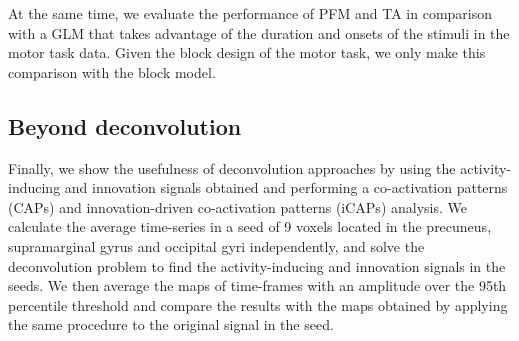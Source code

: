 At the same time, we evaluate the performance of PFM and TA in comparison with a GLM that takes advantage of the duration and onsets of the stimuli in the motor task data. Given the block design of the motor task, we only make this comparison with the block model.

\subsection{Beyond deconvolution}
Finally, we show the usefulness of deconvolution approaches by using the activity-inducing and innovation signals obtained and performing a co-activation patterns (CAPs) and innovation-driven co-activation patterns (iCAPs) analysis. We calculate the average time-series in a seed of 9 voxels located in the precuneus, supramarginal gyrus and occipital gyri independently, and solve the deconvolution problem to find the activity-inducing and innovation signals in the seeds. We then average the maps of time-frames with an amplitude over the 95th percentile threshold and compare the results with the maps obtained by applying the same procedure to the original signal in the seed.